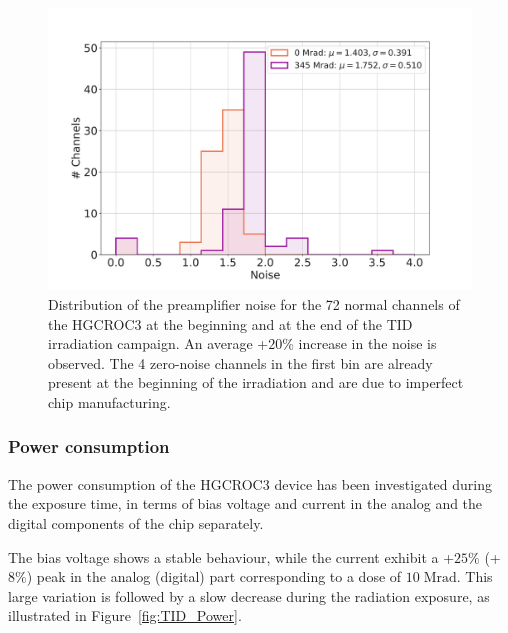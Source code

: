 
\begin{figure}
    \centering
    \includegraphics[width=0.65\linewidth]{Figures/HGCAL/TID_Noise.pdf}
    \caption{Distribution of the preamplifier noise for the 72 normal channels of the HGCROC3 at the beginning and at the end of the TID irradiation campaign. An average +$20\%$ increase in the noise is observed. The 4 zero-noise channels in the first bin are already present at the beginning of the irradiation and are due to imperfect chip manufacturing.}
    \label{fig:TID_Noise}
\end{figure}

\subsubsection{Power consumption}
\label{subsubsec:Power consumption}

The power consumption of the HGCROC3 device has been investigated during the exposure time, in terms of bias voltage and current in the analog and the digital components of the chip separately.

The bias voltage shows a stable behaviour, while the current exhibit a +$25\%$ (+$8\%$) peak in the analog (digital) part corresponding to a dose of $10\;\textrm{Mrad}$. This large variation is followed by a slow decrease during the radiation exposure, as illustrated in Figure~\ref{fig:TID_Power}.

